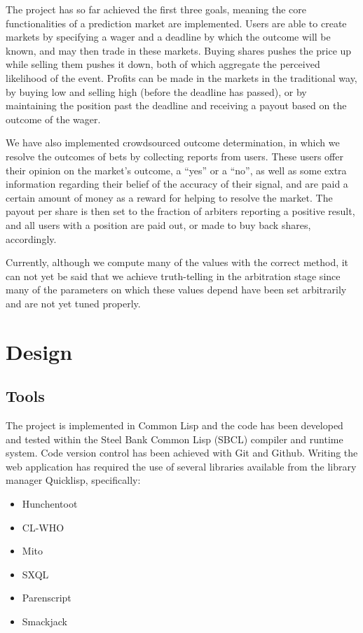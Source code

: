 \documentclass[10pt,a4paper]{article}
\theoremstyle{plain}
\theoremstyle{definition}
\begin{document}
The project has so far achieved the first three goals, meaning the core
functionalities of a prediction market are implemented. Users are able to
create markets by specifying a wager and a deadline by which the outcome will
be known, and may then trade in these markets. Buying shares pushes the price
up while selling them pushes it down, both of which aggregate the perceived
likelihood of the event. Profits can be made in the markets in the traditional
way, by buying low and selling high (before the deadline has passed), or by
maintaining the position past the deadline and receiving a payout based on the
outcome of the wager.

We have also implemented crowdsourced outcome determination, in which we
resolve the outcomes of bets by collecting reports from users. These users
offer their opinion on the market's outcome, a ``yes'' or a ``no'', as well as
some extra information regarding their belief of the accuracy of their signal,
and are paid a certain amount of money as a reward for helping to resolve the
market. The payout per share is then set to the fraction of arbiters reporting
a positive result, and all users with a position are paid out, or made to buy
back shares, accordingly.

Currently, although we compute many of the values with the correct method, it
can not yet be said that we achieve truth-telling in the arbitration stage
since many of the parameters on which these values depend have been set
arbitrarily and are not yet tuned properly.

\section{Design}

\label{sec:design}

\subsection{Tools}

The project is implemented in Common Lisp and the code has been developed and
tested within the Steel Bank Common Lisp (SBCL) compiler and runtime system.
Code version control has been achieved with Git and Github.  Writing the web
application has required the use of several libraries available from the
library manager Quicklisp, specifically:

\begin{itemize}
	\itemsep0em
	\item Hunchentoot
	\item CL-WHO
	\item Mito
	\item SXQL
	\item Parenscript
	\item Smackjack
\end{itemize}
\end{document}

